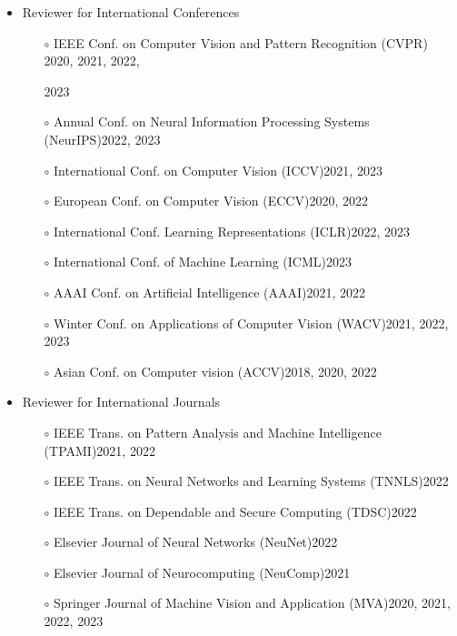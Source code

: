 \documentclass[10pt,margin,line,pifont,palatino,courier]{res}
\begin{document}
\begin{resume}
\begin{itemize}[leftmargin=*]
\item Reviewer for International Conferences
	\begin{itemize}[noitemsep, leftmargin=*]
		\item[$\circ$] IEEE Conf. on Computer Vision and Pattern Recognition (CVPR) \hfill 2020, 2021, 2022,%
			\vspace{-4pt}
			\begin{flushright}2023\end{flushright}
			\vspace{-4pt}
		\item[$\circ$] Annual Conf. on Neural Information Processing Systems (NeurIPS)\hfill 2022, 2023
		\item[$\circ$] International Conf. on Computer Vision (ICCV)\hfill 2021, 2023
		\item[$\circ$] European Conf. on Computer Vision (ECCV)\hfill 2020, 2022
		\item[$\circ$] International Conf. Learning Representations (ICLR)\hfill 2022, 2023
		\item[$\circ$] International Conf. of Machine Learning (ICML)\hfill 2023
		\item[$\circ$] AAAI Conf. on Artificial Intelligence (AAAI)\hfill 2021, 2022
		\item[$\circ$] Winter Conf. on Applications of Computer Vision (WACV)\hfill 2021, 2022, 2023
		\item[$\circ$] Asian Conf. on Computer vision (ACCV)\hfill 2018, 2020, 2022
	\end{itemize}
\item Reviewer for International Journals
	\begin{itemize}[noitemsep, leftmargin=*]
		\item[$\circ$] IEEE Trans. on Pattern Analysis and Machine Intelligence (TPAMI)\hfill 2021, 2022
        \item[$\circ$] IEEE Trans. on Neural Networks and Learning Systems (TNNLS)\hfill 2022
        \item[$\circ$] IEEE Trans. on Dependable and Secure Computing (TDSC)\hfill 2022
        \item[$\circ$] Elsevier Journal of Neural Networks (NeuNet)\hfill 2022
        \item[$\circ$] Elsevier Journal of Neurocomputing (NeuComp)\hfill 2021
		\item[$\circ$] Springer Journal of Machine Vision and Application (MVA)\hfill 2020, 2021, 2022, 2023

\end{itemize}
\end{itemize}
\end{resume}
\end{document}
